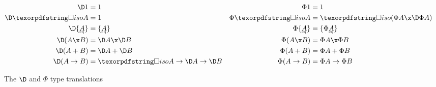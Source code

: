 \begin{figure}
  \begin{align*}
    \D\tunit &= \tunit & \Phi\tunit &= \tunit
    \\
    \D \isof A &= \tunit & \Phi \isof A &= \isof{(\Phi A \x \DP A)}
    \\
    \D\tseteq A &= \tseteq A &
    \Phi\tseteq A &= \tset{\Phi{\eqt A}}\\
    \D(A \x B) &= \D A \x \D B & \Phi(A \x B) &= \Phi A \x \Phi B\\
    \D(A + B) &= \D A + \D B & \Phi(A + B) &= \Phi A + \Phi B\\
    \D(A \to B) &= \isof A \to \D A \to \D B &
    \Phi(A \to B) &= \Phi A \to \Phi B
  \end{align*}


  \caption{The $\D$ and $\Phi$ type translations}
  \label{fig:PhiDelta}
\end{figure}
